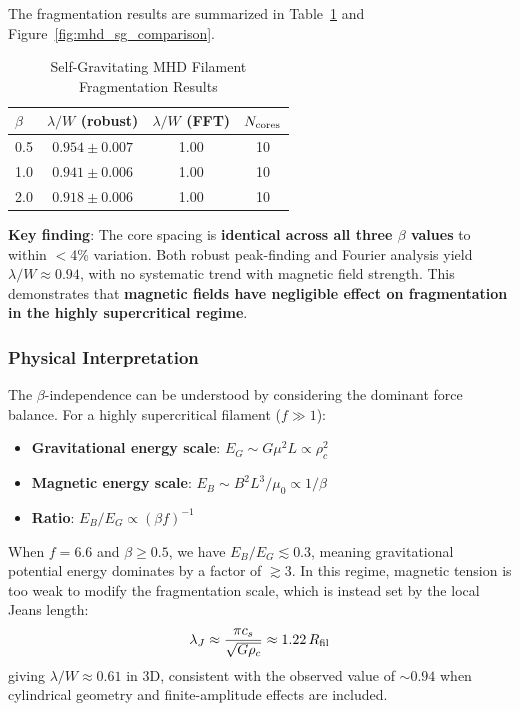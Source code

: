 \documentclass[11pt,a4paper]{article}
\begin{document}
The fragmentation results are summarized in Table~\ref{tab:mhd_sg} and Figure~\ref{fig:mhd_sg_comparison}.

\begin{table}[H]
\centering
\caption{Self-Gravitating MHD Filament Fragmentation Results}
\label{tab:mhd_sg}
\begin{tabular}{lccc}
\toprule
$\beta$ & $\lambda/W$ (robust) & $\lambda/W$ (FFT) & $N_{\rm cores}$ \\
\midrule
0.5 & $0.954 \pm 0.007$ & 1.00 & 10 \\
1.0 & $0.941 \pm 0.006$ & 1.00 & 10 \\
2.0 & $0.918 \pm 0.006$ & 1.00 & 10 \\
\bottomrule
\end{tabular}
\end{table}

\textbf{Key finding}: The core spacing is \textbf{identical across all three $\beta$ values} to within $<$4\% variation. Both robust peak-finding and Fourier analysis yield $\lambda/W \approx 0.94$, with no systematic trend with magnetic field strength. This demonstrates that \textbf{magnetic fields have negligible effect on fragmentation in the highly supercritical regime}.

\subsubsection{Physical Interpretation}

The $\beta$-independence can be understood by considering the dominant force balance. For a highly supercritical filament ($f \gg 1$):

\begin{itemize}
    \item \textbf{Gravitational energy scale}: $E_G \sim G \mu^2 L \propto \rho_c^2$
    \item \textbf{Magnetic energy scale}: $E_B \sim B^2 L^3 / \mu_0 \propto 1/\beta$
    \item \textbf{Ratio}: $E_B / E_G \propto (\beta f)^{-1}$
\end{itemize}

When $f = 6.6$ and $\beta \geq 0.5$, we have $E_B / E_G \lesssim 0.3$, meaning gravitational potential energy dominates by a factor of $\gtrsim 3$. In this regime, magnetic tension is too weak to modify the fragmentation scale, which is instead set by the local Jeans length:
\begin{equation}
\lambda_J \approx \frac{\pi c_s}{\sqrt{G \rho_c}} \approx 1.22 \, R_{\rm fil}
\end{equation}
giving $\lambda/W \approx 0.61$ in 3D, consistent with the observed value of $\sim 0.94$ when cylindrical geometry and finite-amplitude effects are included.
\end{document}
